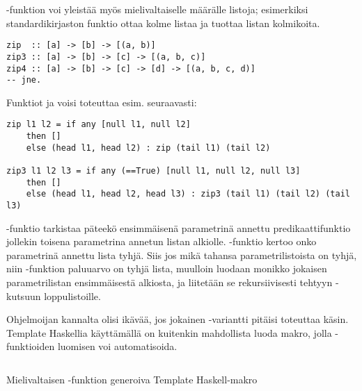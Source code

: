 -funktion voi yleistää myös mielivaltaiselle määrälle listoja;
esimerkiksi standardikirjaston funktio  ottaa kolme listaa ja tuottaa listan kolmikoita.

\begin{verbatim}
zip  :: [a] -> [b] -> [(a, b)]
zip3 :: [a] -> [b] -> [c] -> [(a, b, c)]
zip4 :: [a] -> [b] -> [c] -> [d] -> [(a, b, c, d)]
-- jne.
\end{verbatim}

Funktiot  ja  voisi toteuttaa esim. seuraavasti:

\begin{verbatim}
zip l1 l2 = if any [null l1, null l2]
    then []
    else (head l1, head l2) : zip (tail l1) (tail l2)

zip3 l1 l2 l3 = if any (==True) [null l1, null l2, null l3]
    then []
    else (head l1, head l2, head l3) : zip3 (tail l1) (tail l2) (tail l3)
\end{verbatim}

-funktio tarkistaa päteekö ensimmäisenä parametrinä annettu predikaattifunktio jollekin toisena parametrina annetun listan alkiolle.
-funktio kertoo onko parametrinä annettu lista tyhjä.
Siis jos mikä tahansa parametrilistoista on tyhjä, niin -funktion paluuarvo on tyhjä lista,
muulloin luodaan monikko jokaisen parametrilistan ensimmäisestä alkiosta,
ja liitetään se rekursiivisesti tehtyyn -kutsuun loppulistoille.

Ohjelmoijan kannalta olisi ikävää, jos jokainen -variantti pitäisi toteuttaa käsin.
Template Haskellia käyttämällä on kuitenkin mahdollista luoda makro,
jolla -funktioiden luomisen voi automatisoida.

\begin{listing}[H]
    \inputminted{haskell}{codes/zip-generator/MakeZip.hs}
    \label{lst:make-zip}
    \caption{Mielivaltaisen -funktion generoiva Template Haskell-makro}
\end{listing}
